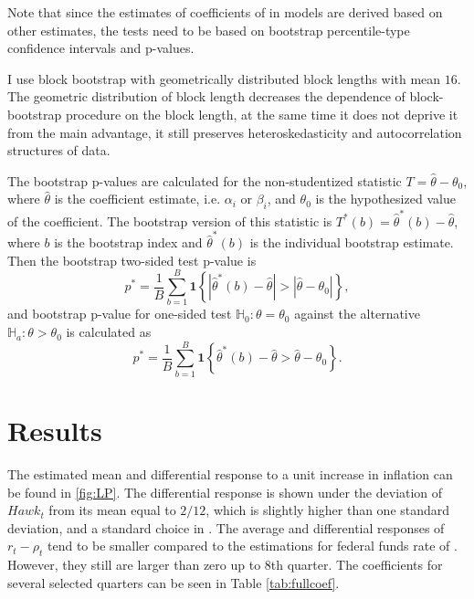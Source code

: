 \documentclass[12pt]{article}
\numberwithin{equation}{section}
\begin{document}
Note that since the estimates of coefficients of in models  are derived based on other estimates, the tests need to be based on bootstrap percentile-type confidence intervals and p-values.

I use block bootstrap with geometrically distributed block lengths with mean $16$. The geometric distribution of block length decreases the dependence of block-bootstrap procedure on the block length, at the same time it does not deprive it from the main advantage, it still preserves heteroskedasticity and autocorrelation structures of data.

The bootstrap p-values are calculated for the non-studentized statistic $T=\hat\theta-\theta_0$, where $\hat\theta$ is the coefficient estimate, i.e. $\alpha_i$ or $\beta_i$, and $\theta_0$ is the hypothesized value of the coefficient. 
The bootstrap version of this statistic is $T^*(b)=\hat\theta^*(b)-\hat\theta$, where $b$ is the bootstrap index and $\hat\theta^*(b)$ is the individual bootstrap estimate. Then the bootstrap two-sided test p-value is
\[p^*=\frac{1}{B}\sum_{b=1}^B\mathbf{1}\left\{\left|\hat\theta^*(b)-\hat\theta\right|>\left|\hat\theta-\theta_0\right|\right\},\]
and bootstrap p-value for one-sided test $\mathbb{H}_0:\theta=\theta_0$ against the alternative $\mathbb{H}_a:\theta>\theta_0$ is calculated as
\[p^*=\frac{1}{B}\sum_{b=1}^B\mathbf{1}\left\{\hat\theta^*(b)-\hat\theta >\hat\theta-\theta_0\right\}.\]




\section{Results}
The estimated mean and differential response to a unit increase in inflation can be found in \vref{fig:LP}. The differential response is shown under the deviation of $\mathit{Hawk}_t$ from its mean equal to $2/12$, which is slightly higher than one standard deviation, and a standard choice in \citet{HIM2023}. The average and differential responses of  $r_t-\rho_t$ tend to be smaller compared to the estimations for federal funds rate of \citet{HIM2023}. However, they still are larger than zero up to 8th quarter. The coefficients for several selected quarters can be seen in Table \vref{tab:fullcoef}. 
\end{document}
